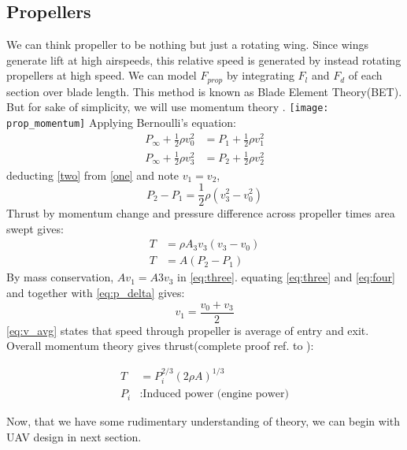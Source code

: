 \subsection{Propellers}
We can think propeller to be nothing but just a rotating wing. Since wings generate lift at high airspeeds, this relative speed is generated by instead rotating propellers at high speed. We can model $F_{prop}$ by integrating $F_l$ and $F_d$ of each section over blade length. This method is known as Blade Element Theory(BET). But for sake of simplicity, we will use momentum theory \cite{momentum_prop}.
\texttt{[image: prop\_momentum]}
Applying Bernoulli’s equation:
\begin{align}
    \label{one}
    P_\infty + \frac{1}{2}\rho v_0^2 &= P_1 + \frac{1}{2}\rho v_1^2 \\
    \label{two}
    P_\infty + \frac{1}{2}\rho v_3^2 &= P_2 + \frac{1}{2}\rho v_2^2
\end{align}
deducting \eqref{two} from \eqref{one} and note $v_1=v_2$,
\begin{equation}
    \label{eq:p_delta}
    P_2 - P_1 = \frac{1}{2}\rho(v_3^2 - v_0^2)
\end{equation}
Thrust by momentum change and pressure difference across propeller times area swept gives:
\begin{align}
    \label{eq:three}
    T &= \rho A_3 v_3(v_3-v_0)\\
    \label{eq:four}
    T &= A(P_2 - P_1)
\end{align}
By mass conservation, $Av_1 = A3v_3$ in \eqref{eq:three}. equating \eqref{eq:three} and \eqref{eq:four} and together with \eqref{eq:p_delta} gives:
\begin{equation}
    \label{eq:v_avg}
    v_1 = \frac{v_0+v_3}{2}
\end{equation} 
\eqref{eq:v_avg} states that speed through propeller is average of entry and exit. Overall momentum theory gives thrust(complete proof ref. to \cite{momentum_prop}):

\begin{align}
    \label{eq:thrust_momentum}
    T &= P_i^{2/3} (2 \rho A)^{1/3}\\
    \nonumber
    P_i &: \text{Induced power (engine power)}
\end{align}

Now, that we have some rudimentary understanding of theory, we can begin with UAV design in next section.